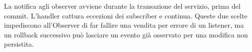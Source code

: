 La notifica agli observer avviene durante la transazione del servizio, prima del commit. L'handler cattura eccezioni dei subscriber e continua. Queste due scelte impediscono all'Observer di far fallire una vendita per errore di un listener, ma un rollback successivo può lasciare un evento già osservato per una modifica non persistita.
